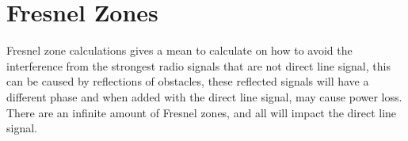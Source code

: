 \chapter{Fresnel Zones}


Fresnel zone \citep{Fres1} \citep{Fres2} calculations gives a mean to calculate on how to avoid the interference from the strongest radio signals that are not direct line signal, this can be caused by reflections of obstacles, these reflected signals will have a different phase and when added with the direct line signal, may cause power loss. There are an infinite amount of Fresnel zones, and all will impact the direct line signal.  %


